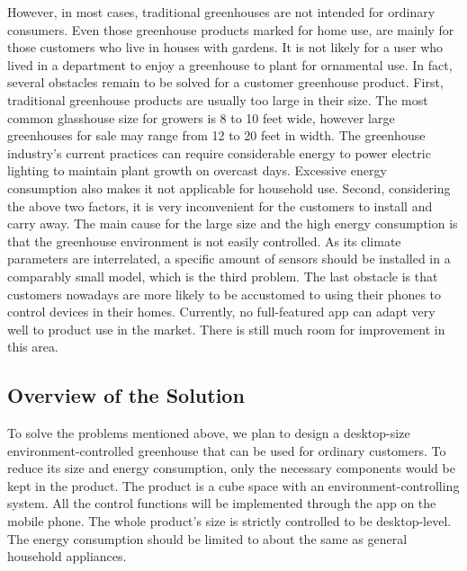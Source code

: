 However, in most cases, traditional greenhouses are not intended for ordinary consumers. Even those greenhouse products marked for home use, are mainly for those customers who live in houses with gardens. It is not likely for a user who lived in a department to enjoy a greenhouse to plant for ornamental use. In fact, several obstacles remain to be solved for a customer greenhouse product. First, traditional greenhouse products are usually too large in their size. The most common glasshouse size for growers is 8 to 10 feet wide, however large greenhouses for sale may range from 12 to 20 feet in width.\cite{hartley_botanic} The greenhouse industry’s current practices can require considerable energy to power electric lighting to maintain plant growth on overcast days.\cite{watson_boudreau_van_iersel_2018} Excessive energy consumption also makes it not applicable for household use. Second, considering the above two factors, it is very inconvenient for the customers to install and carry away. The main cause for the large size and the high energy consumption is that the greenhouse environment is not easily controlled.\cite{rizwan2022optimal} As its climate parameters are interrelated, a specific amount of sensors should be installed in a comparably small model, which is the third problem. The last obstacle is that customers nowadays are more likely to be accustomed to using their phones to control devices in their homes.\cite{scott_2018} Currently, no full-featured app can adapt very well to product use in the market. There is still much room for improvement in this area.



\subsection{Overview of the Solution}
To solve the problems mentioned above, we plan to design a desktop-size environment-controlled greenhouse that can be used for ordinary customers. To reduce its size and energy consumption, only the necessary components would be kept in the product. The product is a cube space with an environment-controlling system. All the control functions will be implemented through the app on the mobile phone. The whole product's size is strictly controlled to be desktop-level. The energy consumption should be limited to about the same as general household appliances. 

